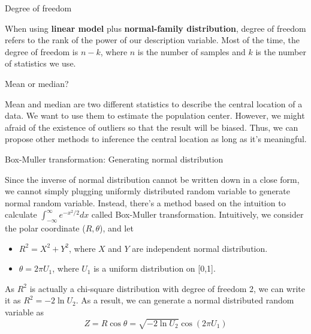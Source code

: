 \documentclass[11pt]{article}
\begin{document}
\begin{remark}{Degree of freedom}
	
When using {\bf linear model} plus {\bf normal-family distribution}, degree of freedom refers to the rank of the power of our description variable. Most of the time, the degree of freedom is $n-k$, where $n$ is the number of samples and $k$ is the number of statistics we use. 
\end{remark}


\begin{remark}{Mean or median?}
	
Mean and median are two different statistics to describe the central location of a data. We want to use them to estimate the population center. However, we might afraid of the existence of outliers so that the result will be biased. Thus, we can propose other methods to inference the central location as long as it's meaningful.
\end{remark}

\begin{remark}{Box-Muller transformation: Generating normal distribution}
	
Since the inverse of normal distribution cannot be written down in a close form, we cannot simply plugging uniformly distributed random variable to generate normal random variable. Instead, there's a method based on the intuition to calculate $\int_{-\infty}^{\infty} e^{-x^2/2}dx$ called Box-Muller transformation. Intuitively, we consider the polar coordinate ($R,\theta$), and let
\begin{itemize}
	\item $R^2 = X^2+Y^2$, where $X$ and $Y$ are independent normal distribution.
	\item $\theta = 2\pi U_1$, where $U_1$ is a uniform distribution on [0,1].
\end{itemize}
As $R^2$ is actually a chi-square distribution with degree of freedom 2, we can write it as $R^2=-2\ln U_2$. As a result, we can generate a normal distributed random variable as
$$Z = R\cos\theta = \sqrt{-2\ln U_2}\cos(2\pi U_1)$$
\end{remark}
\end{document}
